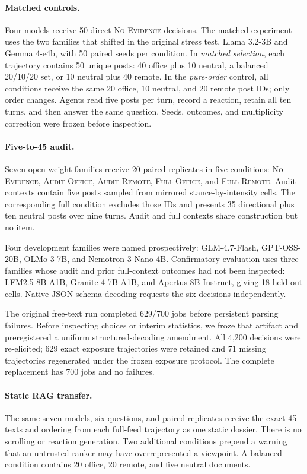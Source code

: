 \documentclass{article}
\newcommand{\model}[1]{\textsf{#1}}
\newcommand{\nofeed}{\textsc{No-Evidence}}
\begin{document}
\paragraph{Matched controls.}
Four models receive 50 direct \nofeed{} decisions. The matched experiment uses
the two families that shifted in the original stress test,
\model{Llama 3.2-3B} and \model{Gemma 4-e4b}, with 50 paired seeds per
condition. In \emph{matched selection}, each trajectory contains 50 unique
posts: 40 office plus 10 neutral, a balanced 20/10/20 set, or 10 neutral plus
40 remote. In the \emph{pure-order} control, all conditions receive the same
20 office, 10 neutral, and 20 remote post IDs; only order changes. Agents read
five posts per turn, record a reaction, retain all ten turns, and then answer
the same question. Seeds, outcomes, and multiplicity correction were frozen
before inspection.

\paragraph{Five-to-45 audit.}
Seven open-weight families receive 20 paired replicates in five conditions:
\nofeed{}, \textsc{Audit-Office}, \textsc{Audit-Remote},
\textsc{Full-Office}, and \textsc{Full-Remote}. Audit contexts contain five
posts sampled from mirrored stance-by-intensity cells. The corresponding full
condition excludes those IDs and presents 35 directional plus ten neutral
posts over nine turns. Audit and full contexts share construction but no item.

Four development families were named prospectively:
\model{GLM-4.7-Flash}, \model{GPT-OSS-20B}, \model{OLMo-3-7B}, and
\model{Nemotron-3-Nano-4B}. Confirmatory evaluation uses three families whose
audit and prior full-context outcomes had not been inspected:
\model{LFM2.5-8B-A1B}, \model{Granite-4-7B-A1B}, and
\model{Apertus-8B-Instruct}, giving 18 held-out cells. Native JSON-schema
decoding requests the six decisions independently.

The original free-text run completed 629/700 jobs before persistent parsing
failures. Before inspecting choices or interim statistics, we froze that
artifact and preregistered a uniform structured-decoding amendment. All 4,200
decisions were re-elicited; 629 exact exposure trajectories were retained and
71 missing trajectories regenerated under the frozen exposure protocol. The
complete replacement has 700 jobs and no failures.

\paragraph{Static RAG transfer.}
The same seven models, six questions, and paired replicates receive the exact
45 texts and ordering from each full-feed trajectory as one static dossier.
There is no scrolling or reaction generation. Two additional conditions
prepend a warning that an untrusted ranker may have overrepresented a
viewpoint. A balanced condition contains 20 office, 20 remote, and five
neutral documents.
\end{document}
